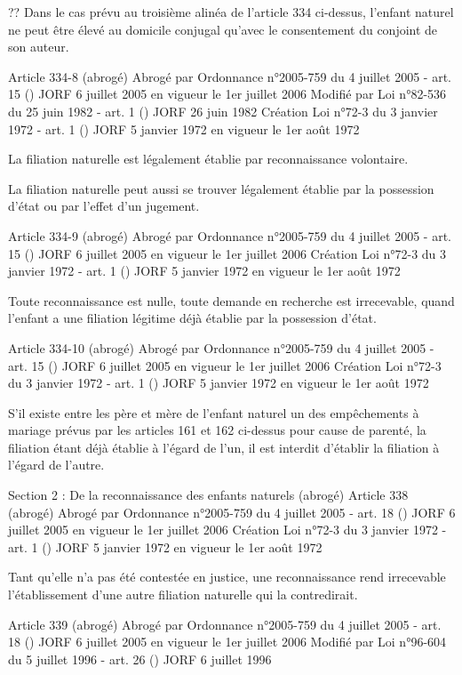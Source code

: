 \documentclass[
  12pt,
]{book}
\begin{document}
\begin{encadre}{??}
Dans le cas prévu au troisième alinéa de l'article 334 ci-dessus, l'enfant naturel ne peut être élevé au domicile conjugal qu'avec le consentement du conjoint de son auteur.

Article 334-8 (abrogé)
Abrogé par Ordonnance n°2005-759 du 4 juillet 2005 - art. 15 () JORF 6 juillet 2005 en vigueur le 1er juillet 2006
Modifié par Loi n°82-536 du 25 juin 1982 - art. 1 () JORF 26 juin 1982
Création Loi n°72-3 du 3 janvier 1972 - art. 1 () JORF 5 janvier 1972 en vigueur le 1er août 1972

La filiation naturelle est légalement établie par reconnaissance volontaire.

La filiation naturelle peut aussi se trouver légalement établie par la possession d'état ou par l'effet d'un jugement.

Article 334-9 (abrogé)
Abrogé par Ordonnance n°2005-759 du 4 juillet 2005 - art. 15 () JORF 6 juillet 2005 en vigueur le 1er juillet 2006
Création Loi n°72-3 du 3 janvier 1972 - art. 1 () JORF 5 janvier 1972 en vigueur le 1er août 1972

Toute reconnaissance est nulle, toute demande en recherche est irrecevable, quand l'enfant a une filiation légitime déjà établie par la possession d'état.

Article 334-10 (abrogé)
Abrogé par Ordonnance n°2005-759 du 4 juillet 2005 - art. 15 () JORF 6 juillet 2005 en vigueur le 1er juillet 2006
Création Loi n°72-3 du 3 janvier 1972 - art. 1 () JORF 5 janvier 1972 en vigueur le 1er août 1972

S'il existe entre les père et mère de l'enfant naturel un des empêchements à mariage prévus par les articles 161 et 162 ci-dessus pour cause de parenté, la filiation étant déjà établie à l'égard de l'un, il est interdit d'établir la filiation à l'égard de l'autre.

Section 2 : De la reconnaissance des enfants naturels (abrogé)
Article 338 (abrogé)
Abrogé par Ordonnance n°2005-759 du 4 juillet 2005 - art. 18 () JORF 6 juillet 2005 en vigueur le 1er juillet 2006
Création Loi n°72-3 du 3 janvier 1972 - art. 1 () JORF 5 janvier 1972 en vigueur le 1er août 1972

Tant qu'elle n'a pas été contestée en justice, une reconnaissance rend irrecevable l'établissement d'une autre filiation naturelle qui la contredirait.

Article 339 (abrogé)
Abrogé par Ordonnance n°2005-759 du 4 juillet 2005 - art. 18 () JORF 6 juillet 2005 en vigueur le 1er juillet 2006
Modifié par Loi n°96-604 du 5 juillet 1996 - art. 26 () JORF 6 juillet 1996


\end{encadre}
\end{document}
